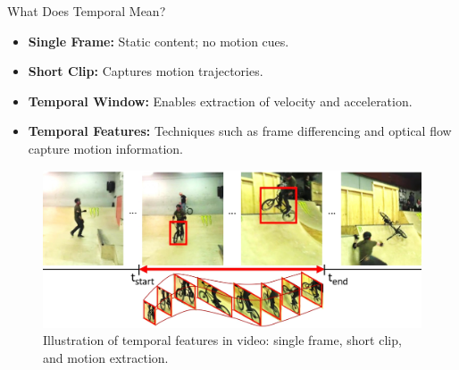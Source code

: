 \begin{frame}[allowframebreaks]{What Does Temporal Mean?}
    \begin{itemize}
        \item \textbf{Single Frame:} Static content; no motion cues.
        \item \textbf{Short Clip:} Captures motion trajectories.
        \item \textbf{Temporal Window:} Enables extraction of velocity and acceleration.
        \item \textbf{Temporal Features:} Techniques such as frame differencing and optical flow capture motion information.
    \end{itemize}
    \begin{figure}
        \centering
        \includegraphics[width=1\textwidth,keepaspectratio]{images/video/temporal_features.png}
        \caption*{Illustration of temporal features in video: single frame, short clip, and motion extraction.}
    \end{figure}
\end{frame}